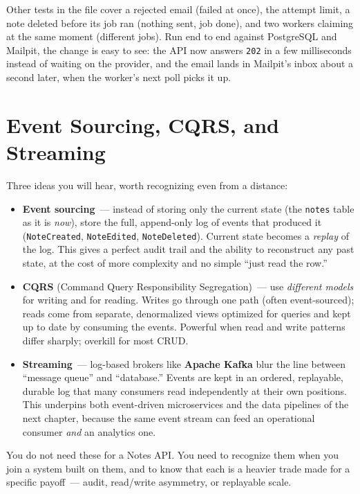 \noindent{}Other tests in the file cover a rejected email (failed at once), the attempt limit, a note deleted before its job ran (nothing sent, job done), and two workers claiming at the same moment (different jobs). Run end to end against PostgreSQL and Mailpit, the change is easy to see: the API now answers \texttt{202} in a few milliseconds instead of waiting on the provider, and the email lands in Mailpit's inbox about a second later, when the worker's next poll picks it up.

\setcounter{section}{5}
\section{Event Sourcing, CQRS, and Streaming}\label{41-event-driven-architecture:416-event-sourcing-cqrs-and-streaming}

Three ideas you will hear, worth recognizing even from a distance:

\begin{itemize}
\tightlist
\item
  \textbf{Event sourcing}~--- instead of storing only the current state (the \texttt{notes} table as it is \emph{now}), store the full, append-only log of events that produced it (\texttt{NoteCreated}, \texttt{NoteEdited}, \texttt{NoteDeleted}). Current state becomes a \emph{replay} of the log. This gives a perfect audit trail and the ability to reconstruct any past state, at the cost of more complexity and no simple ``just read the row.''
\item
  \textbf{CQRS} (Command Query Responsibility Segregation)~--- use \emph{different models} for writing and for reading. Writes go through one path (often event-sourced); reads come from separate, denormalized views optimized for queries and kept up to date by consuming the events. Powerful when read and write patterns differ sharply; overkill for most CRUD.
\item
  \textbf{Streaming}~--- log-based brokers like \textbf{Apache Kafka} blur the line between ``message queue'' and ``database.'' Events are kept in an ordered, replayable, durable log that many consumers read independently at their own positions. This underpins both event-driven microservices and the data pipelines of the next chapter, because the same event stream can feed an operational consumer \emph{and} an analytics one.
\end{itemize}

\noindent{}You do not need these for a Notes API. You need to recognize them when you join a system built on them, and to know that each is a heavier trade made for a specific payoff~--- audit, read/write asymmetry, or replayable scale.

